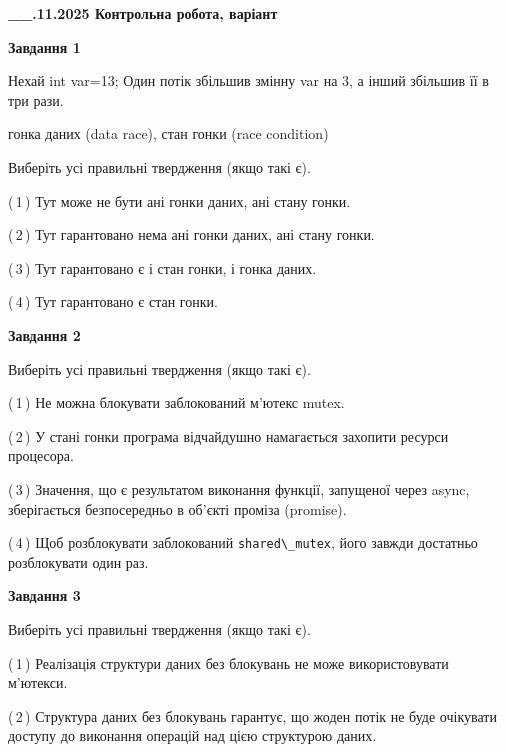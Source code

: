 \documentclass[12pt, ukrainian]{article}
\def\code#1{\Verb!#1!}
\begin{document}
\begin {large}

\textbf{\_\_.11.2025 Контрольна робота, варіант  }\par


{

\begin{center}
\textbf{Завдання 1}
\end{center}
Нехай int var=13; Один потік збільшив змінну var на 3, а інший збільшив її в три рази.

гонка даних (data race), стан гонки (race condition)

Виберіть усі правильні твердження (якщо такі є).\par
\vspace{2mm}
(\,1\,) Тут може не бути ані гонки даних, ані стану гонки.%

(\,2\,) Тут гарантовано нема ані гонки даних, ані стану гонки.%

(\,3\,) Тут гарантовано є і стан гонки, і гонка даних.%

(\,4\,) Тут гарантовано є стан гонки.%



\begin{center}
\textbf{Завдання 2}
\end{center}
Виберіть усі правильні твердження (якщо такі є).\par
\vspace{2mm}

(\,1\,) Не можна блокувати заблокований м’ютекс mutex.%

(\,2\,) У стані гонки програма відчайдушно намагається захопити ресурси процесора.%

(\,3\,) Значення, що є результатом виконання функції, запущеної через async, зберігається безпосередньо в об’єкті проміза (promise).%

(\,4\,) Щоб розблокувати заблокований \code{shared\_mutex}, його завжди достатньо розблокувати один раз.%



\begin{center}
\textbf{Завдання 3}
\end{center}
Виберіть усі правильні твердження (якщо такі є).\par
\vspace{2mm}

(\,1\,) Реалізація структури даних без блокувань не може використовувати м’ютекси.%

(\,2\,) Структура даних без блокувань гарантує, що жоден потік не буде очікувати доступу до виконання операцій над цією структурою даних.%

}
\end{large}
\end{document}
